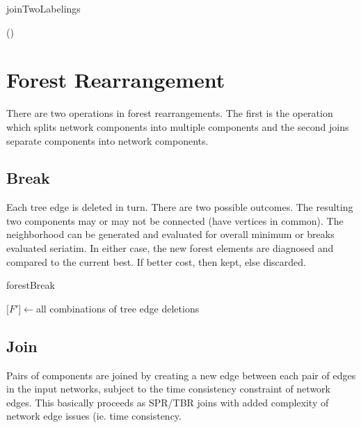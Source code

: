 \documentclass[11pt]{article}
\begin{document}
\begin{algorithm}
	\caption{joinTwoLabelings}
	\label{alg:joinTwo}
	\SetAlgoLined
		 {\Return ()} 			
	\end{algorithm}
 
 \section{Forest Rearrangement}
 There are two operations in forest rearrangements.  The first is the operation which splits network components into
 multiple components and the second joins separate components into network components.
 
 \subsection{Break}
 Each tree edge is deleted in turn.  There are two possible outcomes.  The resulting two components
 may or may not be connected (have vertices in common).  The neighborhood can be generated and evaluated
 for overall minimum or breaks evaluated seriatim.   In either case, the new forest elements 
 are diagnosed and compared to the current best.  If better cost, then kept, else discarded.  
 
	\begin{algorithm}
		\caption{forestBreak}
		\label{alg:forestBreak}
		\SetAlgoLined
		$\lbrack F' \rbrack \leftarrow $all combinations of tree edge deletions\\
	\end{algorithm}

 \subsection{Join}
 Pairs of components are joined by creating a new edge between each pair of edges in the input networks,
 subject to the time consistency constraint of network edges.  This basically proceeds as SPR/TBR joins
 with added complexity of network edge issues (ie. time consistency. 
\end{document}
